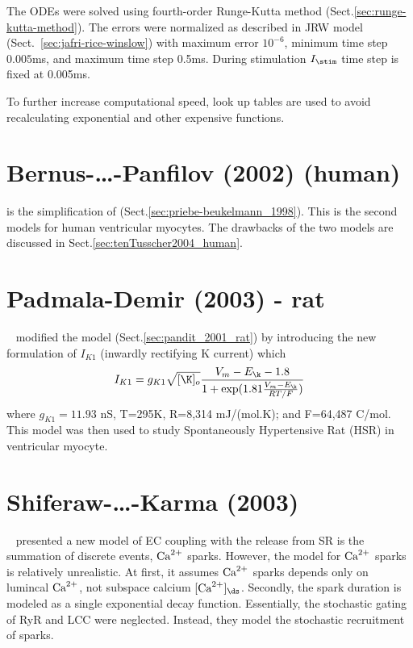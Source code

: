 The ODEs were solved using fourth-order Runge-Kutta method
(Sect.\ref{sec:runge-kutta-method}).
The errors were normalized as described in JRW model
(Sect.~\ref{sec:jafri-rice-winslow}) with maximum error $10^{-6}$,
minimum time step $0.005$ms, and maximum time step 0.5ms. During
stimulation $I_\stim$ time step is fixed at 0.005ms.

To further increase computational speed, look up tables are used to
avoid recalculating exponential and other expensive functions.

\section{Bernus-\ldots-Panfilov (2002) (human)}

\citep{bernus2002} is the simplification of \citep{priebe1998}
(Sect.\ref{sec:priebe-beukelmann_1998}). This is the second models for human
ventricular myocytes. The drawbacks of the two models are discussed in
Sect.\ref{sec:tenTusscher2004_human}.


\section{Padmala-Demir (2003) - rat}

~\citep{padmala2003} modified the model (Sect.\ref{sec:pandit_2001_rat}) by introducing the
new formulation of $I_{K1}$ (inwardly rectifying K current) which
\begin{equation}
  \label{eq:1409}
  I_{K1} = g_{K1} \sqrt{[\K]_o} \frac{V_m-E_\k-1.8}{1+\exp(1.81\frac{V_m-E_\k}{RT/F})}
\end{equation}
where $g_{K1}=11.93$ nS, T=295K, R=8,314 mJ/(mol.K); and F=64,487
C/mol. This model was then used to study Spontaneously Hypertensive
Rat (HSR) in ventricular myocyte.


\section{Shiferaw-\ldots-Karma (2003)}
\label{sec:shiferaw-et-al}

~\citep{shiferaw2003} presented a new model of EC coupling with the release from
SR is the summation of discrete events, ${\text{Ca}^{2+}}$ sparks. However, the model for
${\text{Ca}^{2+}}$ sparks is relatively unrealistic. At first, it assumes ${\text{Ca}^{2+}}$ sparks
depends only on lumincal ${\text{Ca}^{2+}}$, not subspace calcium $[\Ca]_\ds$. Secondly, the
spark duration is modeled as a single exponential decay function. Essentially,
the stochastic gating of RyR and LCC were neglected. Instead, they model the
stochastic recruitment of sparks.


